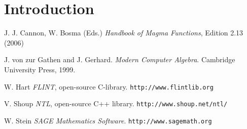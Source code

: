 \documentclass{sig-alternate-05-2015}
\begin{document}
\section{Introduction}
\begin{thebibliography}{99}

J. J. Cannon, W. Bosma (Eds.) {\em Handbook of Magma Functions}, Edition 2.13 (2006)

J. von zur Gathen and J. Gerhard. {\em Modern Computer Algebra}. Cambridge University Press, 1999.

W. Hart {\em FLINT}, open-source C-library. \texttt{http://www.flintlib.org}

V. Shoup {\em NTL}, open-source C++ library. \texttt{http://www.shoup.net/ntl/}

W. Stein {\em SAGE Mathematics Software}.  \texttt{http://www.sagemath.org}

\end{thebibliography}
\end{document}
